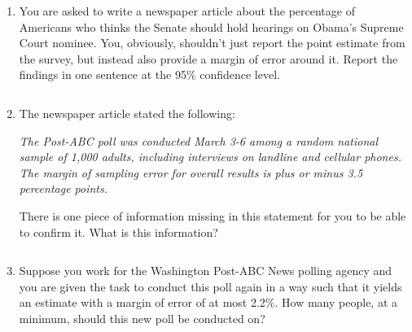 \documentclass[12pt]{article}
\newcommand{\soln}[2]{$\:$\\ \vspace{#1}}{}
\begin{document}
\begin{enumerate}

\item You are asked to write a newspaper article about the percentage of Americans who thinks the Senate should hold hearings on Obama's Supreme Court nominee. You, obviously, shouldn't just report the point estimate from the survey, but instead 
also provide a margin of error around it. Report the findings in one sentence at the 95\% confidence level.

\soln{5cm}{
Conditions: (1) Independence: SRS + 1000 < 10\% of all americans, therefore whether or not one participant in the sample
thinks the Senate should hold hearings on Obama's Supreme Court nominee is independent of another. \\
(2) S: $1000 \times 0.63 = 630$ and F: $1000 \times 0.37 = 370$, both greater than 10. \\
Therefore we can assume that the sampling distribution of Americans who say they have seen or been in the presence
of a ghost in samples of size 2,003 is nearly normal.\\
$SE = \sqrt{ \frac{ 0.63 \times 0.37 }{ 1000 } } = 0.0153$ \\
$0.63 \pm 1.96 \times 0.0153 = 0.63 \pm 0.03 = (0.60, 0.66)$ \\
We are 95\% confident that 60\% to 63\% think the Senate should hold hearings on Obama's Supreme Court nominee.}

\pagebreak

\item The newspaper article stated the following:

\textit{The Post-ABC poll was conducted March 3-6 among a random national sample of 1,000 adults, including interviews on landline and cellular phones. The margin of sampling error for overall results is plus or minus 3.5 percentage points.}

There is one piece of information missing in this statement for you to be able to confirm it. What is this information? 

\soln{2cm}{
The confidence level is not given. It is clearly not 95\%.
}

\item Suppose you work for the Washington Post-ABC News polling agency and you are given the task to conduct this poll again in a way such that it yields an estimate with a margin of error of at most 2.2\%. How many people, at a minimum, should this new poll be conducted on?

\soln{5cm}{
$0.022 \ge 1.96 \sqrt{\frac{0.63 \times 0.37}{n}} \rightarrow n \ge 1850.159$, At least 1851.
}

\end{enumerate}

\end{document}
